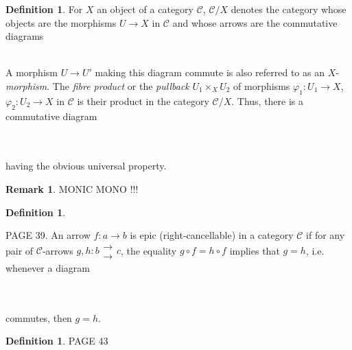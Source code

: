 \documentclass[10]{article}
\theoremstyle{plain}
\theoremstyle{definition}
\theoremstyle{definition}
\newtheorem{definition}[prop]{Definition}
\newtheorem{remark}[prop]{Remark}
\numberwithin{equation}{section}
\newcommand{\7}{\dagger}                     %
\newcommand{\8}{\bullet}                     %
\renewcommand{\.}{\cdot}                     %
\renewcommand{\:}{\colon}                    %
\renewcommand{\:}{\colon}           %
\begin{document}
\begin{appendices}
			\begin{definition}\label{pullback_defn}\cite{milne:lec}
				For $X$ an object of a category $\mathscr C$, $\mathscr C/X$ denotes the category whose objects are the morphisms $U\to X$ in $\mathscr C$
				and whose arrows are the commutative diagrams 
				\newline
				\\
				A morphism $U \to U'$ making this diagram commute is also referred to as an $X$-\textit{morphism}. The \textit{fibre product} or the \textit{pullback} $U_1\times_X U_2$ of morphisms $\varphi_1: U_1\to X$,  $\varphi_2: U_2\to X$ in $\mathscr C$ is their product in the category $\mathscr C/X$. Thus, there is a commutative diagram 
				\newline
				\\
				\\
				having the obvious universal property. 
				
			\end{definition}
			
			\begin{remark}
				MONIC MONO !!!
			\end{remark}
			\begin{definition}\label{epimorphism_defn}\cite{goldblatt:topoi}
				
				PAGE 39.
				An arrow $f:a\to b$ is epic (right-cancellable) in a category $\mathscr C$ if for any 
				pair of $\mathscr C$-arrows $g, h : b\substack{\to\\\to} c$, the equality $g\circ f = h \circ f$ implies that $g = h$, i.e. 
				whenever a diagram 
				\newline
				\\
				\\
				commutes, then $g = h$.
			\end{definition}	
			\begin{definition}\label{initial_ob_defn}\cite{goldblatt:topoi}
				PAGE 43
				

\end{definition}
\end{appendices}
\end{document}
